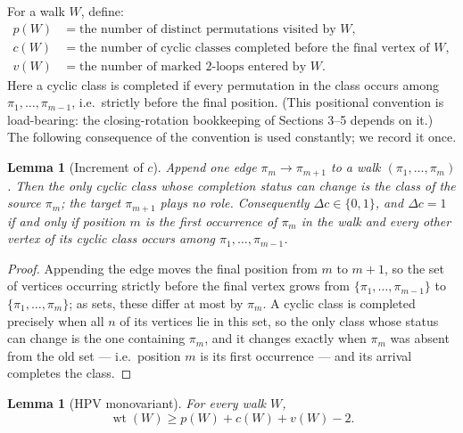 \documentclass[11pt]{article}
\newtheorem{lemma}[theorem]{Lemma}
\DeclareMathOperator{\wt}{wt}
\begin{document}
For a walk \(W\), define:
\[
\begin{aligned}
  p(W)&=\text{the number of distinct permutations visited by }W,\\
  c(W)&=\text{the number of cyclic classes completed before the final vertex of }W,\\
  v(W)&=\text{the number of marked \(2\)-loops entered by }W.
\end{aligned}
\]
Here a cyclic class is completed if every permutation in the class occurs among
\(\pi_1,\ldots,\pi_{m-1}\), i.e.\ strictly before the final position.  (This positional
convention is load-bearing: the closing-rotation bookkeeping of Sections 3--5 depends on it.)
The following consequence of the convention is used constantly; we record it once.

\begin{lemma}[Increment of \(c\)]\label{lem:deltac}
Append one edge \(\pi_m\to\pi_{m+1}\) to a walk \((\pi_1,\ldots,\pi_m)\).  Then the only
cyclic class whose completion status can change is the class of the \emph{source}
\(\pi_m\); the target \(\pi_{m+1}\) plays no role.  Consequently \(\Delta c\in\{0,1\}\),
and \(\Delta c=1\) if and only if position \(m\) is the first occurrence of \(\pi_m\) in the
walk and every other vertex of its cyclic class occurs among \(\pi_1,\ldots,\pi_{m-1}\).
\end{lemma}

\begin{proof}
Appending the edge moves the final position from \(m\) to \(m+1\), so the set of vertices
occurring strictly before the final vertex grows from \(\{\pi_1,\ldots,\pi_{m-1}\}\) to
\(\{\pi_1,\ldots,\pi_m\}\); as sets, these differ at most by \(\pi_m\).  A cyclic class is
completed precisely when all \(n\) of its vertices lie in this set, so the only class whose
status can change is the one containing \(\pi_m\), and it changes exactly when \(\pi_m\) was
absent from the old set --- i.e.\ position \(m\) is its first occurrence --- and its arrival
completes the class.
\end{proof}

\begin{lemma}[HPV monovariant]\label{lem:hpv}
For every walk \(W\),
\[
  \wt(W)\ge p(W)+c(W)+v(W)-2. \tag{1}
\]
\end{lemma}
\end{document}
